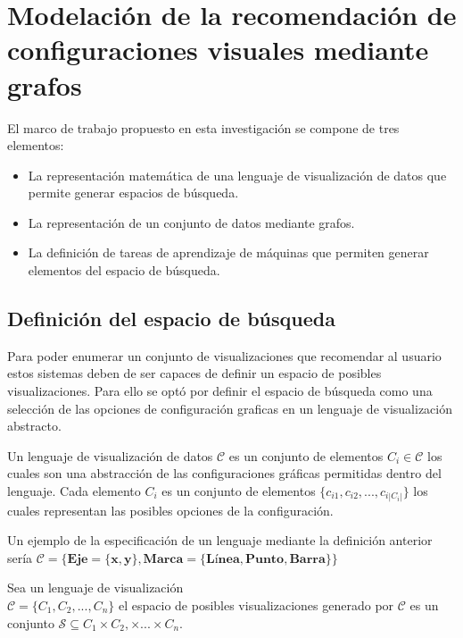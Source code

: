 \section{Modelaci\'on de la recomendaci\'on de configuraciones visuales mediante grafos}\label{section:graph-framework}

El marco de trabajo propuesto en esta investigaci\'on se compone de tres elementos:

\begin{itemize}
    \item La representaci\'on matem\'atica de una lenguaje de visualizaci\'on de datos que permite generar espacios de b\'usqueda.
    \item La representaci\'on de un conjunto de datos mediante grafos.
    \item La definici\'on de tareas de aprendizaje de m\'aquinas que permiten generar elementos del espacio de b\'usqueda.
\end{itemize}

\subsection{Definici\'on del espacio de b\'usqueda}

Para poder enumerar un conjunto de visualizaciones que recomendar
al usuario estos sistemas deben de ser capaces de definir un espacio
de posibles visualizaciones. Para ello se opt\'o por definir el
espacio de b\'usqueda como una selecci\'on de las opciones de configuraci\'on
graficas en un lenguaje de visualizaci\'on abstracto.

\begin{definition}
    Un lenguaje de visualizaci\'on de datos $\mathcal{C}$ es un
    conjunto de elementos $C_i \in \mathcal{C}$ los cuales son una
    abstracci\'on de las configuraciones gr\'aficas permitidas dentro
    del lenguaje. Cada elemento $C_i$ es un conjunto de elementos
    $\{ c_{i1}, c_{i2},..., c_{i|C_i|}\}$ los cuales representan las
    posibles opciones de la configuraci\'on.
\end{definition}

Un ejemplo de la especificaci\'on de un lenguaje mediante la definici\'on anterior
ser\'ia $\mathcal{C} = \{ \textbf{Eje} = \{ \textbf{x}, \textbf{y} \}, 
\textbf{Marca} = \{ \textbf{L\'inea}, \textbf{Punto}, \textbf{Barra} \} \}$

\begin{definition}
    Sea un lenguaje de visualizaci\'on \\ $\mathcal{C} = \{ C_1, C_2, ..., C_n \}$
    el espacio de posibles visualizaciones generado por $\mathcal{C}$ es un
    conjunto $\mathcal{S} \subseteq C_1 \times C_2, \times ... \times C_n$.
\end{definition}

